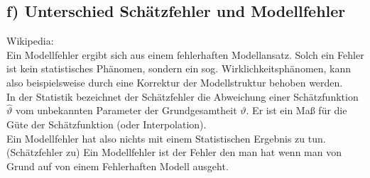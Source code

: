 \documentclass{scrartcl}
\begin{document}
\subsection*{f) Unterschied Schätzfehler und Modellfehler}
Wikipedia: \\
Ein Modellfehler ergibt sich aus einem fehlerhaften Modellansatz. Solch ein Fehler ist kein statistisches Phänomen, sondern ein sog. Wirklichkeitsphänomen, kann also beispielsweise durch eine Korrektur der Modellstruktur behoben werden. \\
In der Statistik bezeichnet der Schätzfehler die Abweichung einer Schätzfunktion $\hat{\vartheta}$ vom unbekannten Parameter der Grundgesamtheit $\vartheta$. Er ist ein Maß für die Güte der Schätzfunktion (oder Interpolation). \\

Ein Modellfehler hat also nichts mit einem Statistischen Ergebnis zu tun.(Schätzfehler zu) Ein Modellfehler ist der Fehler den man hat wenn man von Grund auf von einem Fehlerhaften Modell ausgeht. \\
\end{document}
